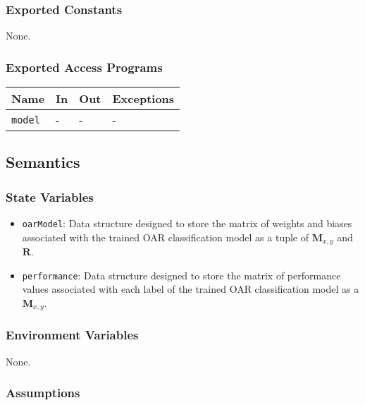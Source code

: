 \documentclass[12pt, titlepage]{article}
\def\code#1{\texttt{#1}}
\begin{document}
\subsubsection{Exported Constants}

None.

\subsubsection{Exported Access Programs}

\begin{center}
\begin{tabular}{p{2cm} p{4cm} p{4cm} p{2cm}}
\hline
\textbf{Name} & \textbf{In} & \textbf{Out} & \textbf{Exceptions} \\
\hline
\code{model} & - & - & - \\
\hline
\end{tabular}
\end{center}

\subsection{Semantics}

\subsubsection{State Variables}

\begin{itemize}
  \item \code{oarModel}: Data structure designed to store the matrix of weights and biases associated
   with the trained OAR classification model as a tuple of $\mathbf{M}_{x,y}$ and $\mathbf{R}$.
   \item \code{performance}: Data structure designed to store the matrix of performance values associated
   with each label of the trained OAR classification model as a $\mathbf{M}_{x,y}$.
\end{itemize}

\subsubsection{Environment Variables}

None.

\subsubsection{Assumptions}
\end{document}
